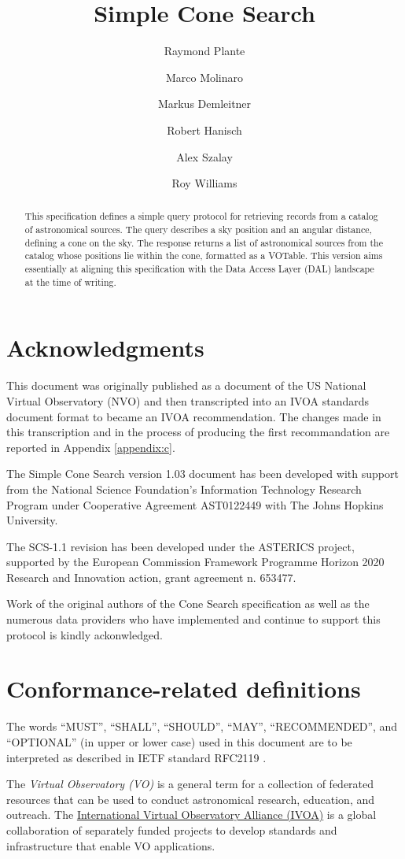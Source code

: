 \documentclass[11pt,a4paper]{ivoa}
\title{Simple Cone Search}
\author[http://www.ivoa.net/twiki/bin/view/IVOA/RayPlante]{Raymond Plante}
\author[http://www.ivoa.net/twiki/bin/view/IVOA/MarcoMolinaro]{Marco Molinaro}
\author[http://www.ivoa.net/twiki/bin/view/IVOA/MarkusDemleitner]{Markus Demleitner}
\author[http://www.ivoa.net/twiki/bin/view/IVOA/BobHanisch]{Robert Hanisch}
\author[http://www.ivoa.net/twiki/bin/view/IVOA/AlexSzalay]{Alex Szalay}
\author[http://www.ivoa.net/twiki/bin/view/IVOA/RoyWilliams]{Roy Williams}
\begin{document}
\begin{abstract}
This specification defines a simple query protocol for retrieving records from a catalog of astronomical sources. The query describes a sky position and an angular distance, defining a cone on the sky. The response returns a list of astronomical sources from the catalog whose positions lie within the cone, formatted as a VOTable. This version aims essentially at aligning this specification with the Data Access Layer (DAL) landscape at the time of writing.
\end{abstract}


\section*{Acknowledgments}
This document was originally published as a document of the US National Virtual Observatory (NVO)  and then transcripted into an IVOA standards document format to became an IVOA recommendation. The changes made in this transcription and in the process of producing the first recommandation are reported in Appendix \ref{appendix:c}.

The Simple Cone Search version 1.03 document has been developed with support from the National Science Foundation's Information Technology Research Program under Cooperative Agreement AST0122449 with The Johns Hopkins University.

The SCS-1.1 revision has been developed under the ASTERICS project, supported by the European Commission Framework Programme Horizon 2020 Research and Innovation action, grant agreement n. 653477.

Work of the original authors of the Cone Search specification as well as the numerous data providers who have implemented and continue to support this protocol is kindly ackonwledged.

\section*{Conformance-related definitions}

The words ``MUST'', ``SHALL'', ``SHOULD'', ``MAY'', ``RECOMMENDED'', and
``OPTIONAL'' (in upper or lower case) used in this document are to be
interpreted as described in IETF standard RFC2119 \citep{std:RFC2119}.

The \emph{Virtual Observatory (VO)} is a
general term for a collection of federated resources that can be used
to conduct astronomical research, education, and outreach.
The \href{http://www.ivoa.net}{International
Virtual Observatory Alliance (IVOA)} is a global
collaboration of separately funded projects to develop standards and
infrastructure that enable VO applications.
\end{document}
